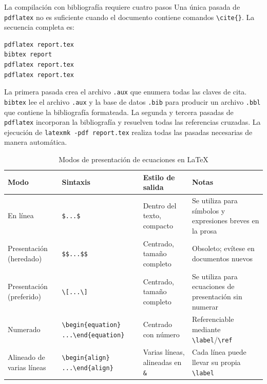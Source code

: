 \begin{warningbox}{La compilación con bibliografía requiere cuatro pasos}
Una única pasada de \texttt{pdflatex} no es suficiente cuando el
documento contiene comandos \verb|\cite{}|. La secuencia completa es:

\begin{verbatim}
pdflatex report.tex
bibtex report
pdflatex report.tex
pdflatex report.tex
\end{verbatim}

La primera pasada crea el archivo \texttt{.aux} que enumera todas las
claves de cita. \texttt{bibtex} lee el archivo \texttt{.aux} y la
base de datos \texttt{.bib} para producir un archivo \texttt{.bbl}
que contiene la bibliografía formateada. La segunda y tercera pasadas
de \texttt{pdflatex} incorporan la bibliografía y resuelven todas las
referencias cruzadas. La ejecución de \texttt{latexmk -pdf report.tex}
realiza todas las pasadas necesarias de manera automática.
\end{warningbox}

\begin{table}[htbp]
\centering
\caption{Modos de presentación de ecuaciones en \LaTeX{}}
\label{tab:equation-modes}
\begin{tabular}{p{2.8cm} p{4.2cm} p{2.5cm} p{4.5cm}}
\toprule
\textbf{Modo} & \textbf{Sintaxis} & \textbf{Estilo de salida} & \textbf{Notas} \\
\midrule
En línea & \verb|$...$| & Dentro del texto, compacto & Se utiliza para símbolos y expresiones breves en la prosa \\
Presentación (heredado) & \verb|$$...$$| & Centrado, tamaño completo & Obsoleto; evítese en documentos nuevos \\
Presentación (preferido) & \verb|\[...\]| & Centrado, tamaño completo & Se utiliza para ecuaciones de presentación sin numerar \\
Numerado & \verb|\begin{equation}| \verb|...\end{equation}| & Centrado con número & Referenciable mediante \verb|\label|/\verb|\ref| \\
Alineado de varias líneas & \verb|\begin{align}| \verb|...\end{align}| & Varias líneas, alineadas en \verb|&| & Cada línea puede llevar su propia \verb|\label| \\
\bottomrule
\end{tabular}
\end{table}

